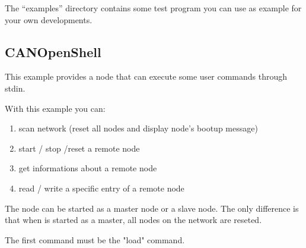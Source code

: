 \documentclass[12pt,english,a4paper]{book}
\begin{document}
The {}``examples'' directory contains some test program you can
use as example for your own developments.

\subsection{CANOpenShell}

This example provides a node that can execute some user commands through stdin. 

With this example you can:
\begin{enumerate}
\item scan network (reset all nodes and display node's bootup message)
\item start / stop /reset a remote node
\item get informations about a remote node
\item read / write a specific entry of a remote node
\end{enumerate}

The node can be started as a master node or a slave node. The only difference is 
that when is started as a master, all nodes on the network are reseted.

The first command must be the "load" command.
\end{document}

